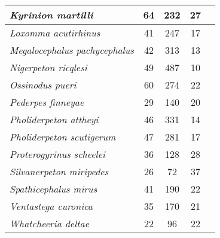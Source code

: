 \begin{tabular}{|L{4.5cm}|c|c|c|L{4.5cm}|}
\textit{Kyrinion martilli}&64&232&27&\\\hline
\textit{Loxomma acutirhinus}&41&247&17&\\\hline
\textit{Megalocephalus pachycephalus}&42&313&13&\\\hline
\textit{Nigerpeton ricqlesi}&49&487&10&\cite{Beau77a}\\\hline
\textit{Ossinodus pueri}&60&274&22&\\\hline
\textit{Pederpes finneyae}&29&140&20&\\\hline
\textit{Pholiderpeton attheyi}&46&331&14&\cite{Clac04a}\\\hline
\textit{Pholiderpeton scutigerum}&47&281&17&\cite{Bent90a}\\\hline
\textit{Proterogyrinus scheelei}&36&128&28&\cite{Clac02b,Porr15a}\\\hline
\textit{Silvanerpeton miripedes}&26&72&37&\cite{Miln09a}\\\hline
\textit{Spathicephalus mirus}&41&190&22&\\\hline
\textit{Ventastega curonica}&35&170&21&\\\hline
\textit{Whatcheeria deltae}&22&96&22&\\\hline
\end{tabular}
